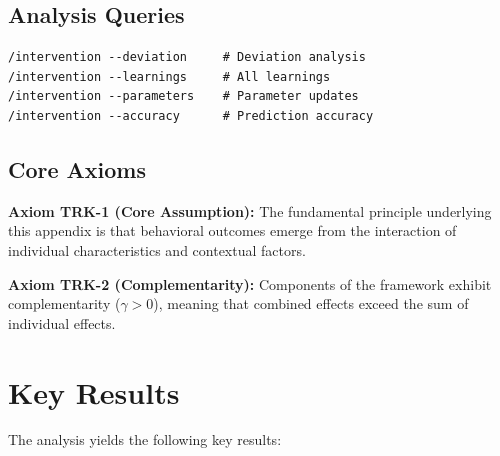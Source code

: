 \subsection{Analysis Queries}

\begin{verbatim}
/intervention --deviation     # Deviation analysis
/intervention --learnings     # All learnings
/intervention --parameters    # Parameter updates
/intervention --accuracy      # Prediction accuracy
\end{verbatim}


\subsection{Core Axioms}
\label{sec:trk-axioms}

\begin{tcolorbox}[colback=yellow!5!white,colframe=yellow!75!black,title=Axiom TRK-1: Fundamental Principle]
\textbf{Axiom TRK-1 (Core Assumption):}
The fundamental principle underlying this appendix is that behavioral outcomes
emerge from the interaction of individual characteristics and contextual factors.
\end{tcolorbox}

\begin{tcolorbox}[colback=yellow!5!white,colframe=yellow!75!black,title=Axiom TRK-2: Complementarity]
\textbf{Axiom TRK-2 (Complementarity):}
Components of the framework exhibit complementarity ($\gamma > 0$), meaning
that combined effects exceed the sum of individual effects.
\end{tcolorbox}



\section{Key Results}
\label{sec:trk-results}

The analysis yields the following key results:

